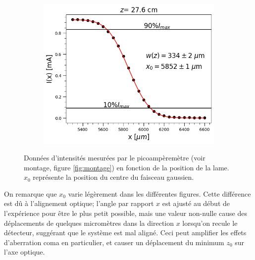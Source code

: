 \documentclass[10pt,letterpaper,twocolumn]{article}
\begin{document}
\begin{figure}[H]
\begin{subfigure}[t]{0.6\linewidth}
	\includegraphics[width=\linewidth]{figures/0_2760_fit.png}
\end{subfigure}

\caption{Données d'intensités mesurées par le picoampèremètre (voir montage, figure \ref{fig:montage}) en fonction de la position de la lame. $x_0$ représente la position du centre du faisceau gaussien. }
\label{fig:fit}
\end{figure}

On remarque que $x_0$ varie légèrement dans les différentes figures. Cette différence est dû à l'alignement optique; l'angle par rapport $x$ est ajusté au début de l'expérience pour être le plus petit possible, mais une valeur non-nulle cause des déplacements de quelques micromètres dans la direction $x$ lorsqu'on recule le détecteur, suggérant que le système est mal aligné. Ceci peut amplifier les effets d'aberration coma en particulier, et causer un déplacement du minimum $z_0$ sur l'axe optique. 
\end{document}
